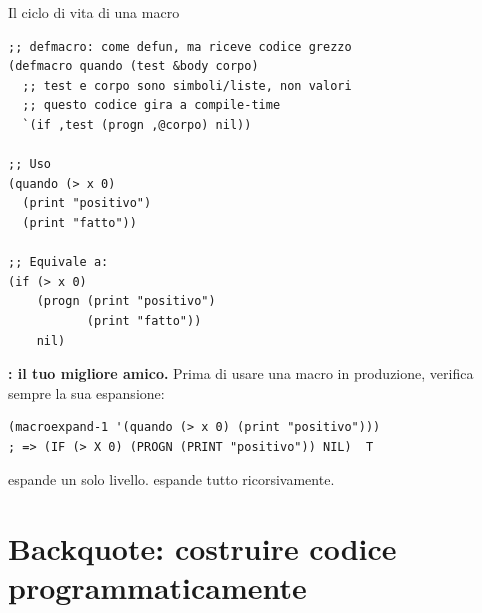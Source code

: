 \begin{concetto}{Il ciclo di vita di una macro}

\boxsep
{}
\end{concetto}

\begin{esempio}
\begin{lstlisting}
;; defmacro: come defun, ma riceve codice grezzo
(defmacro quando (test &body corpo)
  ;; test e corpo sono simboli/liste, non valori
  ;; questo codice gira a compile-time
  `(if ,test (progn ,@corpo) nil))

;; Uso
(quando (> x 0)
  (print "positivo")
  (print "fatto"))

;; Equivale a:
(if (> x 0)
    (progn (print "positivo")
           (print "fatto"))
    nil)
\end{lstlisting}
\end{esempio}

\begin{attenzione}
\textbf{: il tuo migliore amico.}
Prima di usare una macro in produzione, verifica sempre la sua
espansione:
\begin{lstlisting}
(macroexpand-1 '(quando (> x 0) (print "positivo")))
; => (IF (> X 0) (PROGN (PRINT "positivo")) NIL)  T
\end{lstlisting}
 espande un solo livello.
 espande tutto ricorsivamente.
\end{attenzione}

\section{Backquote: costruire codice programmaticamente}

